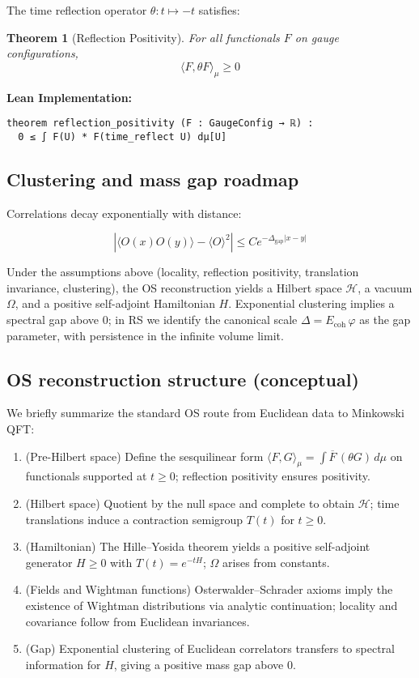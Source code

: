\documentclass[11pt]{amsart}
\theoremstyle{plain}
\newtheorem{theorem}{Theorem}[section]
\theoremstyle{definition}
\theoremstyle{remark}
\newcommand{\massGap}{\Delta_{\text{gap}}}
\begin{document}
The time reflection operator $\theta: t \mapsto -t$ satisfies:

\begin{theorem}[Reflection Positivity]
For all functionals $F$ on gauge configurations,
\begin{equation}
\langle F, \theta F \rangle_{\mu} \geq 0
\end{equation}
\end{theorem}

\textbf{Lean Implementation:}
\begin{lstlisting}
theorem reflection_positivity (F : GaugeConfig → ℝ) :
  0 ≤ ∫ F(U) * F(time_reflect U) dμ[U]
\end{lstlisting}

\subsection{Clustering and mass gap roadmap}

Correlations decay exponentially with distance:

\begin{equation}
|\langle O(x) O(y) \rangle - \langle O \rangle^2| \leq C e^{-\massGap |x-y|}
\end{equation}

Under the assumptions above (locality, reflection positivity, translation invariance, clustering), the OS reconstruction yields a Hilbert space $\mathcal H$, a vacuum $\Omega$, and a positive self-adjoint Hamiltonian $H$. Exponential clustering implies a spectral gap above $0$; in RS we identify the canonical scale $\Delta = E_{\text{coh}}\,\varphi$ as the gap parameter, with persistence in the infinite volume limit.

\subsection{OS reconstruction structure (conceptual)}
We briefly summarize the standard OS route from Euclidean data to Minkowski QFT:
\begin{enumerate}
  \item (Pre-Hilbert space) Define the sesquilinear form $\langle F, G\rangle_\mu = \int \overline{F}\, (\theta G)\, d\mu$ on functionals supported at $t\ge 0$; reflection positivity ensures positivity.
  \item (Hilbert space) Quotient by the null space and complete to obtain $\mathcal H$; time translations induce a contraction semigroup $T(t)$ for $t\ge 0$.
  \item (Hamiltonian) The Hille--Yosida theorem yields a positive self-adjoint generator $H\ge 0$ with $T(t)=e^{-tH}$; $\Omega$ arises from constants.
  \item (Fields and Wightman functions) Osterwalder--Schrader axioms imply the existence of Wightman distributions via analytic continuation; locality and covariance follow from Euclidean invariances.
  \item (Gap) Exponential clustering of Euclidean correlators transfers to spectral information for $H$, giving a positive mass gap above $0$.
\end{enumerate}
\end{document}
